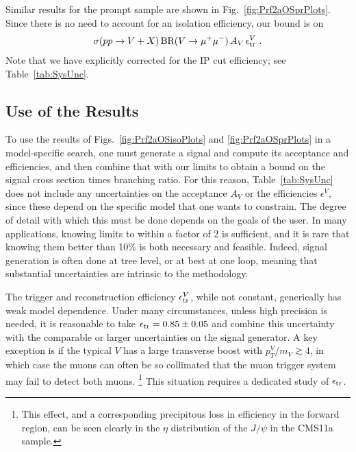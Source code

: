 \documentclass[aps,prd,twocolumn,superscriptaddress,preprintnumbers,nofootinbib,longbibliography,floatfix]{revtex4-1}
\newcommand{\BR}{\text{BR}}
\DeclareRobustCommand{\Tab}[1]{Table~\ref{#1}}
\DeclareRobustCommand{\Fig}[1]{Fig.~\ref{#1}}
\DeclareRobustCommand{\Figs}[2]{Figs.~\ref{#1} and \ref{#2}}
\begin{document}
Similar results for the prompt sample are shown in \Fig{fig:Prf2aOSprPlots}.
%
Since there is no need to account for an isolation efficiency, our bound is on 
%
\begin{align}
\label{eq:limit_prompt}
	\sigma(pp\to V+X) \, \BR (V\to\mu^+\mu^-) \, A_V \, \epsilon^V_{\rm tr} \ . 
\end{align}
%
Note that we have explicitly corrected for the IP cut efficiency; see \Tab{tab:SysUnc}.

\subsection{Use of the Results}
\label{subsec:use_results}

To use the results of \Figs{fig:Prf2aOSisoPlots}{fig:Prf2aOSprPlots} in a model-specific search, one must generate a signal and compute its acceptance and efficiencies, and then combine that with our limits to obtain a bound on the signal cross section times branching ratio.
%
For this reason, \Tab{tab:SysUnc} does not include any uncertainties on the acceptance $A_V$ or the efficiencies $\epsilon^V$, since these depend on the specific model that one wants to constrain.
%
The degree of detail with which this must be done depends on the goals of the user.
%
In many applications, knowing limits to within a factor of 2 is sufficient, and it is rare that knowing them better than 10\% is both necessary and feasible.
%
Indeed, signal generation is often done at tree level, or at best at one loop, meaning that substantial uncertainties are intrinsic to the methodology.

The trigger and reconstruction efficiency $\epsilon^V_{\rm tr}$, while not constant, generically has weak model dependence.
%
Under many circumstances, unless high precision is needed, it is reasonable to take $\epsilon_{{\rm tr}}=0.85 \pm 0.05$  and combine this uncertainty with the comparable or larger uncertainties on the signal generator. 
%
A key exception is if the typical $V$ has a large transverse boost with $p_T^V/m_V \gtrsim 4$, in which case the muons can often be so collimated that the muon trigger system may fail to detect both muons.%
%
\footnote{This effect, and a corresponding precipitous loss in efficiency in the forward region, can be seen clearly in the $\eta$ distribution of the $J/\psi$ in 
the CMS11a sample.}
%
This situation requires a dedicated study of $\epsilon_{{\rm tr}}$.%
\end{document}

